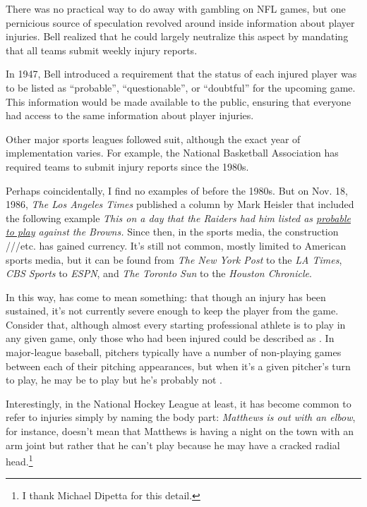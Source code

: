 There was no practical way to do away with gambling on NFL games, but one pernicious source of speculation revolved around inside information about player injuries. Bell realized that he could largely neutralize this aspect by mandating that all teams submit weekly injury reports.

In 1947, Bell introduced a requirement that the status of each injured player was to be listed as \enquote{probable}, \enquote{questionable}, or \enquote{doubtful} for the upcoming game. This information would be made available to the public, ensuring that everyone had access to the same information about player injuries.

Other major sports leagues followed suit, although the exact year of implementation varies. For example, the National Basketball Association has required teams to submit injury reports since the 1980s.

Perhaps coincidentally, I find no examples of  before the 1980s. But on Nov. 18, 1986, \textit{The Los Angeles Times} published a column by Mark Heisler that included the following example \textit{This on a day that the Raiders had him listed as \uline{probable to play} against the Browns.} Since then, in the sports media, the construction ///etc. has gained currency. It's still not common, mostly limited to American sports media, but it can be found from \textit{The New York Post} to the \textit{LA Times}, \textit{CBS Sports} to \textit{ESPN}, and \textit{The Toronto Sun} to the \textit{Houston Chronicle}.

In this way,  has come to mean something: that though an injury has been sustained, it's not currently severe enough to keep the player from the game. Consider that, although almost every starting professional athlete is  to play in any given game, only those who had been injured could be described as . In major-league baseball, pitchers typically have a number of non-playing games between each of their pitching appearances, but when it's a given pitcher's turn to play, he may be  to play but he's probably not .

Interestingly, in the National Hockey League at least, it has become common to refer to injuries simply by naming the body part: \textit{Matthews is out with an elbow}, for instance, doesn't mean that Matthews is having a night on the town with an arm joint but rather that he can't play because he may have a cracked radial head.\footnote{I thank Michael Dipetta for this detail.}

